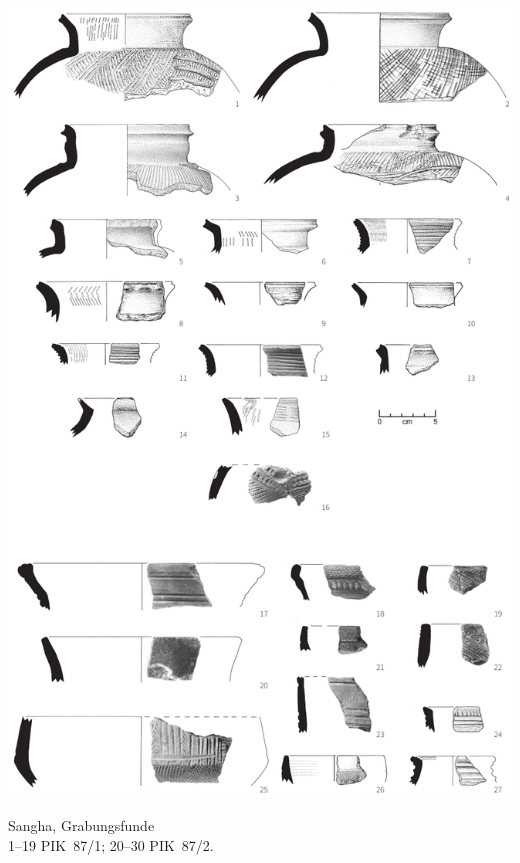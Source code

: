 \begin{pl}[H]
	\includegraphics{plt/Taf48.pdf}
	\vspace{.75em}\caption{\mbox{Sangha}, Grabungsfunde \\ 1--19 PIK~87/1; 20--30 PIK~87/2.}
	\label{pl:48}
\end{pl}

